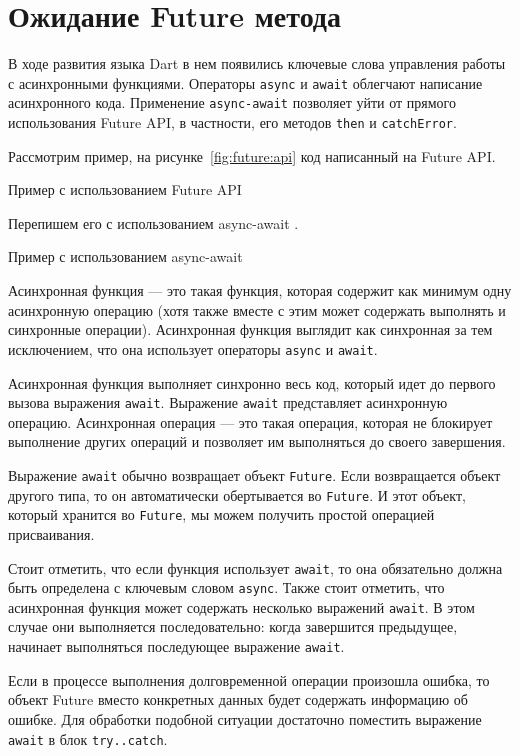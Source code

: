 \section{Ожидание Future метода}

В ходе развития языка Dart в нем появились ключевые слова управления работы
с асинхронными функциями.
Операторы \texttt{async} и \texttt{await} облегчают
написание асинхронного кода.
Применение \texttt{async-await} позволяет уйти
от прямого использования Future API, в частности,
его методов \texttt{then} и \texttt{catchError}.

Рассмотрим пример, на рисунке~\ref{fig:future:api}
код написанный на Future API.

\begin{image}
	\caption{Пример с использованием Future API}
	\label{fig:future:api}
\end{image}

Перепишем его с использованием async-await .

\begin{image}
	\caption{Пример с использованием async-await}
	\label{fig:async-await}
\end{image}

Асинхронная функция --- это такая функция,
которая содержит как минимум одну асинхронную операцию
(хотя также вместе с этим может содержать выполнять и синхронные операции).
Асинхронная функция выглядит как синхронная за тем исключением,
что она использует операторы \texttt{async} и \texttt{await}.\par
Асинхронная функция выполняет синхронно весь код,
который идет до первого вызова выражения \texttt{await}.
Выражение \texttt{await} представляет асинхронную операцию.
Асинхронная операция --- это такая операция,
которая не блокирует выполнение других операций
и позволяет им выполняться до своего завершения.\par
Выражение \texttt{await} обычно возвращает объект \texttt{Future}.
Если возвращается объект другого типа, то он автоматически обертывается
во \texttt{Future}. И этот объект, который хранится во \texttt{Future},
мы можем получить простой операцией присваивания.\par
Стоит отметить, что если функция использует \texttt{await},
то она обязательно должна быть определена с ключевым словом \texttt{async}.
Также стоит отметить,
что асинхронная функция может содержать несколько выражений \texttt{await}.
В этом случае они выполняется последовательно: когда завершится предыдущее,
начинает выполняться последующее выражение \texttt{await}.\par
Если в процессе выполнения долговременной операции произошла ошибка,
то объект Future вместо конкретных данных будет содержать информацию об ошибке.
Для обработки подобной ситуации достаточно поместить
выражение \texttt{await} в блок \texttt{try..catch}.

